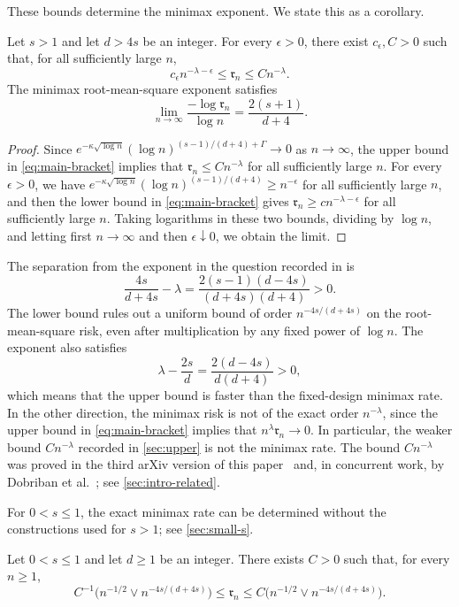 These bounds determine the minimax exponent. We state this as a corollary.
\begin{corollary}\label{thm:exponent}
Let $s>1$ and let $d>4s$ be an integer. For every $\epsilon>0$, there
exist $c_\epsilon,C>0$ such that, for all sufficiently large $n$,
\[
 c_\epsilon n^{-\lambda-\epsilon}\le\mathfrak r_n\le Cn^{-\lambda}.
\]
The minimax root-mean-square exponent satisfies
\[
 \lim_{n\to\infty}\frac{-\log\mathfrak r_n}{\log n}
 =\frac{2(s+1)}{d+4}.
\]
\end{corollary}
\begin{proof}
Since
$e^{-\kappa\sqrt{\log n}}(\log n)^{(s-1)/(d+4)+\Gamma}\to0$ as
$n\to\infty$, the upper bound in \eqref{eq:main-bracket} implies that
$\mathfrak r_n\le Cn^{-\lambda}$ for all sufficiently large $n$. For
every $\epsilon>0$, we have
$e^{-\kappa\sqrt{\log n}}(\log n)^{(s-1)/(d+4)}\ge n^{-\epsilon}$ for all
sufficiently large $n$, and then the
lower bound in \eqref{eq:main-bracket} gives
$\mathfrak r_n\ge cn^{-\lambda-\epsilon}$ for all sufficiently large
$n$. Taking logarithms in these two bounds, dividing by $\log n$, and
letting first $n\to\infty$ and then $\epsilon\downarrow0$, we obtain the
limit.
\end{proof}
The separation from the exponent in the question recorded in
\cite[Section~6]{RichardsonRotnitzky2014} is
\begin{equation}\label{eq:intro-gap}
 \frac{4s}{d+4s}-\lambda
 =\frac{2(s-1)(d-4s)}{(d+4s)(d+4)}>0.
\end{equation}
The lower bound rules out a uniform bound of order
\(n^{-4s/(d+4s)}\) on the root-mean-square risk, even after
multiplication by any fixed power of \(\log n\). The exponent also satisfies
\[
 \lambda-\frac{2s}{d}=\frac{2(d-4s)}{d(d+4)}>0,
\]
which means that the upper bound is faster than the fixed-design
minimax rate.
In the other direction, the minimax risk is not of the exact order
$n^{-\lambda}$, since the upper bound in \eqref{eq:main-bracket} implies
that $n^{\lambda}\mathfrak r_n\to0$. In particular, the weaker bound
$Cn^{-\lambda}$ recorded in \cref{sec:upper} is not the minimax rate.
The bound $Cn^{-\lambda}$ was proved in the third arXiv version of
this paper~\cite{AronowLopatto2026v3} and, in concurrent work, by
Dobriban et al.~\cite[Proposition~3.4]{DobribanEtAl2026}; see
\cref{sec:intro-related}.

For \(0<s\le1\), the exact minimax rate can be determined without the
constructions used for \(s>1\); see \cref{sec:small-s}.
\begin{theorem}\label{thm:main2}
Let $0<s\le1$ and let $d\ge1$ be an integer. There exists $C>0$
such that, for every $n\ge1$,
\begin{equation}\label{eq:main-rate}
 C^{-1}\bigl(n^{-1/2}\vee n^{-4s/(d+4s)}\bigr)
 \le\mathfrak r_n\le
 C\bigl(n^{-1/2}\vee n^{-4s/(d+4s)}\bigr).
\end{equation}
\end{theorem}

